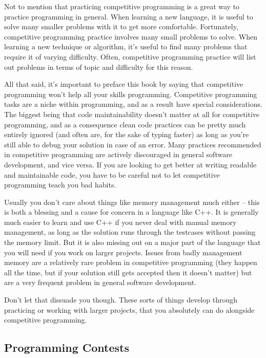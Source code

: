 Not to mention that practicing competitive programming is a great way to practice programming in general. When learning a new language, it is useful to solve many smaller problems with it to get more comfortable. Fortunately, competitive programming practice involves many small problems to solve. When learning a new technique or algorithm, it's useful to find many problems that require it of varying difficulty. Often, competitive programming practice will list out problems in terms of topic and difficulty for this reason.

All that said, it's important to preface this book by saying that competitive programming won't help all your skills programming. Competitive programming tasks are a niche within programming, and as a result have special considerations. The biggest being that code maintainability doesn't matter at all for competitive programming, and as a consequence clean code practices can be pretty much entirely ignored (and often are, for the sake of typing faster) as long as you're still able to debug your solution in case of an error. Many practices recommended in competitive programming are actively discouraged in general software development, and vice versa. If you are looking to get better at writing readable and maintainable code, you have to be careful not to let competitive programming teach you bad habits.

Usually you don't care about things like memory management much either -- this is both a blessing and a cause for concern in a language like C++. It is generally much easier to learn and use C++ if you never deal with manual memory management, as long as the solution runs through the testcases without passing the memory limit. But it is also missing out on a major part of the language that you will need if you work on larger projects. Issues from badly management memory are a relatively rare problem in competitive programming (they happen all the time, but if your solution still gets accepted then it doesn't matter) but are a very frequent problem in general software development.

Don't let that dissuade you though. These sorts of things develop through practicing or working with larger projects, that you absolutely can do alongside competitive programming.

\subsection{Programming Contests}

